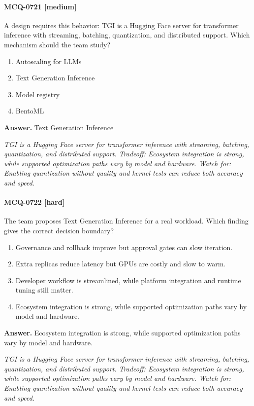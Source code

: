 \paragraph{MCQ-0721 [medium]} A design requires this behavior: TGI is a Hugging Face server for transformer inference with streaming, batching, quantization, and distributed support. Which mechanism should the team study?
\begin{enumerate}[label=\Alph*.]
\item Autoscaling for LLMs
\item Text Generation Inference
\item Model registry
\item BentoML
\end{enumerate}
\noindent\textbf{Answer.} Text Generation Inference
\par\textit{TGI is a Hugging Face server for transformer inference with streaming, batching, quantization, and distributed support. Tradeoff: Ecosystem integration is strong, while supported optimization paths vary by model and hardware. Watch for: Enabling quantization without quality and kernel tests can reduce both accuracy and speed.}
\paragraph{MCQ-0722 [hard]} The team proposes Text Generation Inference for a real workload. Which finding gives the correct decision boundary?
\begin{enumerate}[label=\Alph*.]
\item Governance and rollback improve but approval gates can slow iteration.
\item Extra replicas reduce latency but GPUs are costly and slow to warm.
\item Developer workflow is streamlined, while platform integration and runtime tuning still matter.
\item Ecosystem integration is strong, while supported optimization paths vary by model and hardware.
\end{enumerate}
\noindent\textbf{Answer.} Ecosystem integration is strong, while supported optimization paths vary by model and hardware.
\par\textit{TGI is a Hugging Face server for transformer inference with streaming, batching, quantization, and distributed support. Tradeoff: Ecosystem integration is strong, while supported optimization paths vary by model and hardware. Watch for: Enabling quantization without quality and kernel tests can reduce both accuracy and speed.}
